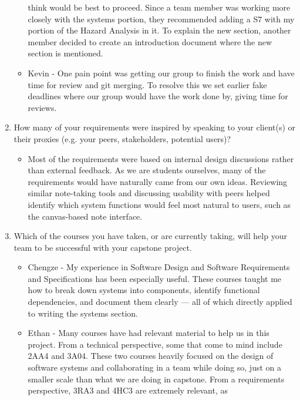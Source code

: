 \begin{enumerate}
\begin{itemize}
        think would be best to proceed. Since a team member was working more 
        closely with the systems portion, they recommended adding a S7 with my
        portion of the Hazard Analysis in it. To explain the new section,
        another member decided to create an introduction document where the
        new section is mentioned. 
        \item Kevin - One pain point was getting our group to finish the work 
        and have time for review and git merging. To resolve this we set earlier 
        fake deadlines where our group would have the work done by, giving time 
        for reviews.
  \end{itemize} 
  \item How many of your requirements were inspired by speaking to your
  client(s) or their proxies (e.g. your peers, stakeholders, potential users)?
  \begin{itemize}
        \item Most of the requirements were based on internal design discussions 
        rather than external feedback. As we are students ourselves, many of the 
        requirements would have naturally came from our own ideas. Reviewing 
        similar note-taking tools and discussing usability with peers helped 
        identify which system functions would feel most natural to users, such 
        as the canvas-based note interface.
  \end{itemize} 
  \item Which of the courses you have taken, or are currently taking, will help
  your team to be successful with your capstone project.
  \begin{itemize}
        \item Chengze - My experience in Software Design and Software Requirements 
        and Specifications has been especially useful. These courses taught me how 
        to break down systems into components, identify functional dependencies, and 
        document them clearly — all of which directly applied to writing the systems section.
        \item Ethan - Many courses have had relevant material to help us in
          this project. From a technical perspective, some that come to mind
          include 2AA4 and 3A04. These two courses heavily focused on the
          design of software systems and collaborating in a team while doing
          so, just on a smaller scale than what we are doing in capstone. From
          a requirements perspective, 3RA3 and 4HC3 are extremely relevant, as

\end{itemize}
\end{enumerate}
